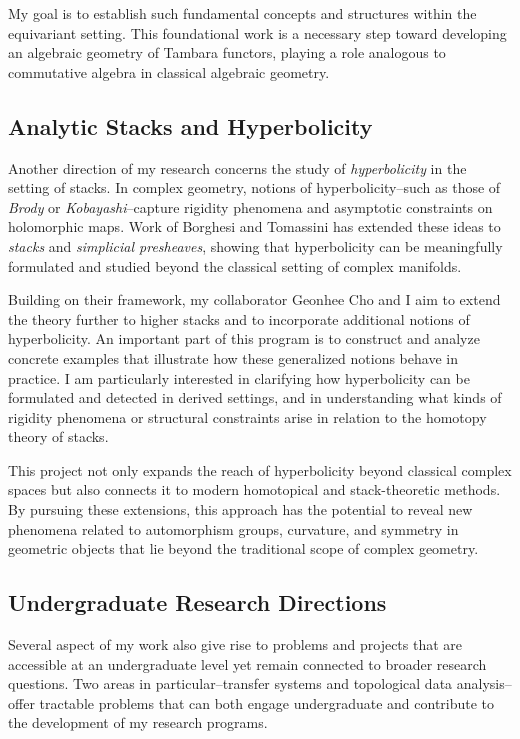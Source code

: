 \documentclass[11pt]{article}
\begin{document}
My goal is to establish such fundamental concepts and structures within the equivariant setting.
This foundational work is a necessary step toward developing an algebraic geometry of Tambara functors, playing a role analogous to commutative algebra in classical algebraic geometry.


\subsection*{Analytic Stacks and Hyperbolicity}
Another direction of my research concerns the study of {\it hyperbolicity} in the setting of stacks.
In complex geometry, notions of hyperbolicity--such as those of {\it Brody} or {\it Kobayashi}--capture rigidity phenomena and asymptotic constraints on holomorphic maps.
Work of Borghesi and Tomassini \cite{MR3673667} has extended these ideas to {\it stacks} and {\it simplicial presheaves}, showing that hyperbolicity can be meaningfully formulated and studied beyond the classical setting of complex manifolds.

Building on their framework, my collaborator Geonhee Cho and I aim to extend the theory further to higher stacks and to incorporate additional notions of hyperbolicity.
An important part of this program is to construct and analyze concrete examples that illustrate how these generalized notions behave in practice.
I am particularly interested in clarifying how hyperbolicity can be formulated and detected in derived settings, and in understanding what kinds of rigidity phenomena or structural constraints arise in relation to the homotopy theory of stacks.

This project not only expands the reach of hyperbolicity beyond classical complex spaces but also connects it to modern homotopical and stack-theoretic methods. By pursuing these extensions, this approach has the potential to reveal new phenomena related to automorphism groups, curvature, and symmetry in geometric objects that lie beyond the traditional scope of complex geometry.


\subsection*{Undergraduate Research Directions}
Several aspect of my work also give rise to problems and projects that are accessible at an undergraduate level yet remain connected to broader research questions.
Two areas in particular--transfer systems and topological data analysis--offer tractable problems that can both engage undergraduate and contribute to the development of my research programs.
\end{document}
